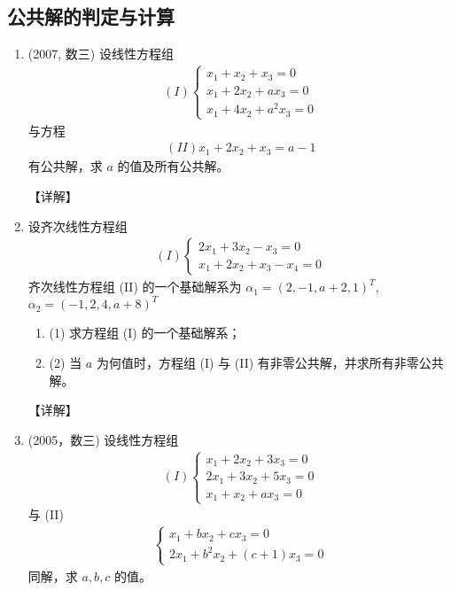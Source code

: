 \documentclass[12pt, a4paper, oneside, UTF8]{ctexbook}
\begin{document}
\subsection{公共解的判定与计算}

\begin{enumerate}[label=\arabic*.,start=12]
    \item (2007, 数三) 设线性方程组
    \begin{align*}
    (I) \begin{cases}
    x_1 + x_2 + x_3 = 0 \\
    x_1 + 2x_2 + a x_3 = 0 \\
    x_1 + 4x_2 + a^2 x_3 = 0
    \end{cases}
    \end{align*}
    与方程
    \begin{align*}
    (II) x_1 + 2x_2 + x_3 = a - 1
    \end{align*}
    有公共解，求 $a$ 的值及所有公共解。
    
    \begin{solution}
    【详解】
    \end{solution}
    
    \item 设齐次线性方程组
    \begin{align*}
    (I) \begin{cases}
    2x_1 + 3x_2 - x_3 = 0 \\
    x_1 + 2x_2 + x_3 - x_4 = 0
    \end{cases}
    \end{align*}
    齐次线性方程组 (II) 的一个基础解系为 $\alpha_1 = (2, -1, a+2, 1)^T$, $\alpha_2 = (-1, 2, 4, a+8)^T$ 
    \begin{enumerate}
        \item (1) 求方程组 (I) 的一个基础解系；
        \item (2) 当 $a$ 为何值时，方程组 (I) 与 (II) 有非零公共解，并求所有非零公共解。
    \end{enumerate}
    
    \begin{solution}
    【详解】
    \end{solution}
    
    \item (2005，数三) 设线性方程组
    \begin{align*}
    (I) \begin{cases}
    x_1 + 2x_2 + 3x_3 = 0 \\
    2x_1 + 3x_2 + 5x_3 = 0 \\
    x_1 + x_2 + a x_3 = 0
    \end{cases}
    \end{align*}
    与 (II) 
    \begin{align*}
    \begin{cases}
    x_1 + b x_2 + c x_3 = 0 \\
    2x_1 + b^2 x_2 + (c+1) x_3 = 0
    \end{cases}
    \end{align*}
    同解，求 $a, b, c$ 的值。
    

\end{enumerate}
\end{document}
